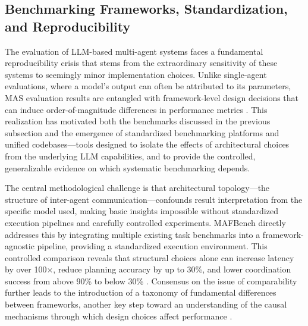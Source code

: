 \documentclass[11pt,a4paper]{article}
\begin{document}
\subsection{Benchmarking Frameworks, Standardization, and Reproducibility}


The evaluation of LLM-based multi-agent systems faces a fundamental reproducibility crisis that stems from the extraordinary sensitivity of these systems to seemingly minor implementation choices. Unlike single-agent evaluations, where a model's output can often be attributed to its parameters, MAS evaluation results are entangled with framework-level design decisions that can induce order-of-magnitude differences in performance metrics \cite{arxiv:2602.03128v1}. This realization has motivated both the benchmarks discussed in the previous subsection and the emergence of standardized benchmarking platforms and unified codebases---tools designed to isolate the effects of architectural choices from the underlying LLM capabilities, and to provide the controlled, generalizable evidence on which systematic benchmarking depends.

The central methodological challenge is that architectural topology---the structure of inter-agent communication---confounds result interpretation from the specific model used, making basic insights impossible without standardized execution pipelines and carefully controlled experiments. MAFBench directly addresses this by integrating multiple existing task benchmarks into a framework-agnostic pipeline, providing a standardized execution environment. This controlled comparison reveals that structural choices alone can increase latency by over 100$\times$, reduce planning accuracy by up to 30\%, and lower coordination success from above 90\% to below 30\% \cite{arxiv:2602.03128v1}. Consensus on the issue of comparability further leads to the introduction of a taxonomy of fundamental differences between frameworks, another key step toward an understanding of the causal mechanisms through which design choices affect performance \cite{arxiv:2602.03128v1}.
\end{document}
